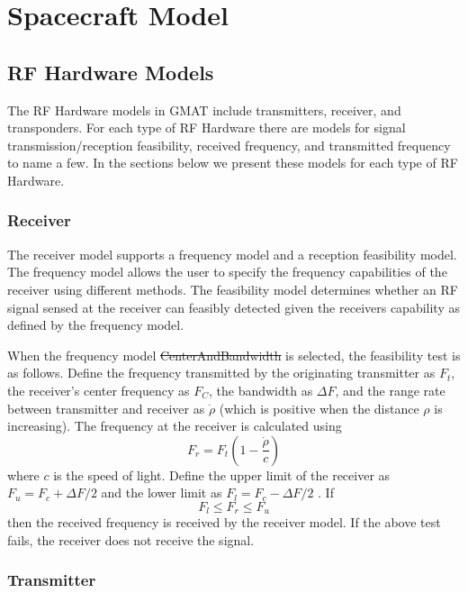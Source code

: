 \section{Spacecraft Model}

\subsection{RF Hardware Models}

The RF Hardware models in GMAT include transmitters, receiver, and transponders.  For each type of RF Hardware there are models for signal transmission/reception feasibility, received frequency, and transmitted frequency to name a few.  In the sections below we present these models for each type of RF Hardware.

\subsubsection{Receiver}

The receiver model supports a frequency model and a reception feasibility model.  The frequency model allows the user to specify the frequency capabilities of the receiver using different methods.  The feasibility model determines whether an RF signal sensed at the receiver can feasibly detected given the receivers capability as defined by the frequency model.
  
When the frequency model \st{CenterAndBandwidth} is selected, the feasibility test is as follows.  Define the frequency transmitted by the originating transmitter as $F_t$, the receiver's center frequency as $F_C$, the bandwidth as $\Delta F$, and the range rate between transmitter and receiver as $\dot{\rho}$ (which is positive when the distance $\rho$ is increasing).  The frequency at the receiver is calculated using
%
\begin{equation}
     F_r = F_t(1 - \frac{\dot{\rho}}{c})
\end{equation}
%
where $c$ is the speed of light.  Define the upper limit of the receiver as $F_u = F_c + \Delta F / 2$ and the lower limit as $F_l = F_c - \Delta F / 2$ .  If
%
\begin{equation}
       F_l \leq F_r \leq F_u
\end{equation}
%
then the received frequency is received by the receiver model.  If the above test fails, the receiver does not receive the signal.

\subsubsection{Transmitter}



